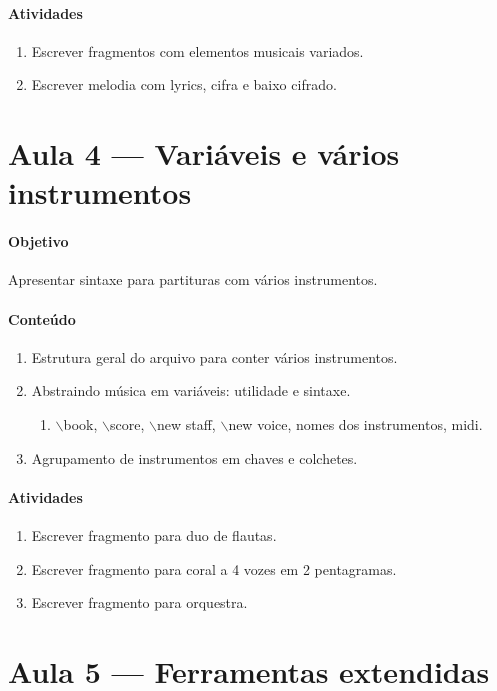 \documentclass[12pt,brazil]{article}
\begin{document}
\paragraph{Atividades}
\begin{enumerate}
\item Escrever fragmentos com elementos musicais variados.
\item Escrever melodia com lyrics, cifra e baixo cifrado.
\end{enumerate}

\break

\section{Aula 4 --- Variáveis e vários instrumentos}
\paragraph{Objetivo}
Apresentar sintaxe para partituras com vários instrumentos.
\paragraph{Conteúdo}
\begin{enumerate}
\item Estrutura geral do arquivo para conter vários instrumentos.
\item Abstraindo música em variáveis: utilidade e sintaxe.
  \begin{enumerate}
  \item $\backslash$book, $\backslash$score, $\backslash$new staff,
    $\backslash$new voice, nomes dos instrumentos, midi.
  \end{enumerate}
\item Agrupamento de instrumentos em chaves e colchetes.
\end{enumerate}
\paragraph{Atividades}
\begin{enumerate}
\item Escrever fragmento para duo de flautas.
\item Escrever fragmento para coral a 4 vozes em 2 pentagramas.
\item Escrever fragmento para orquestra.
\end{enumerate}

\section{Aula 5 --- Ferramentas extendidas}
\end{document}
